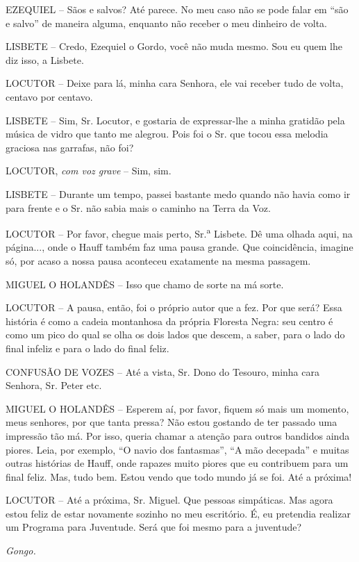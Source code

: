 EZEQUIEL -- Sãos e salvos? Até parece. No meu caso não se pode falar em
``são e salvo'' de maneira alguma, enquanto não receber o meu dinheiro
de volta.

LISBETE -- Credo, Ezequiel o Gordo, você não muda mesmo. Sou eu quem lhe
diz isso, a Lisbete.

LOCUTOR -- Deixe para lá, minha cara Senhora, ele vai receber tudo de
volta, centavo por centavo.

LISBETE -- Sim, Sr. Locutor, e gostaria de expressar-lhe a minha
gratidão pela música de vidro que tanto me alegrou. Pois foi o Sr. que
tocou essa melodia graciosa nas garrafas, não foi?

LOCUTOR, \emph{com voz grave} -- Sim, sim.

LISBETE -- Durante um tempo, passei bastante medo quando não havia como
ir para frente e o Sr. não sabia mais o caminho na Terra da Voz.

LOCUTOR -- Por favor, chegue mais perto, Sr.\textsuperscript{a} Lisbete.
Dê uma olhada aqui, na página..., onde o Hauff também faz uma pausa
grande. Que coincidência, imagine só, por acaso a nossa pausa aconteceu
exatamente na mesma passagem.

MIGUEL O HOLANDÊS -- Isso que chamo de sorte na má sorte.

LOCUTOR -- A pausa, então, foi o próprio autor que a fez. Por que será?
Essa história é como a cadeia montanhosa da própria Floresta Negra: seu
centro é como um pico do qual se olha os dois lados que descem, a saber,
para o lado do final infeliz e para o lado do final feliz.

CONFUSÃO DE VOZES -- Até a vista, Sr. Dono do Tesouro, minha cara
Senhora, Sr. Peter etc.

MIGUEL O HOLANDÊS -- Esperem aí, por favor, fiquem só mais um momento,
meus senhores, por que tanta pressa? Não estou gostando de ter passado
uma impressão tão má. Por isso, queria chamar a atenção para outros
bandidos ainda piores. Leia, por exemplo, ``O navio dos fantasmas'', ``A
mão decepada'' e muitas outras histórias de Hauff, onde rapazes muito
piores que eu contribuem para um final feliz. Mas, tudo bem. Estou vendo
que todo mundo já se foi. Até a próxima!

LOCUTOR -- Até a próxima, Sr. Miguel. Que pessoas simpáticas. Mas agora
estou feliz de estar novamente sozinho no meu escritório. É, eu
pretendia realizar um Programa para Juventude. Será que foi mesmo para a
juventude?

\emph{Gongo.}

